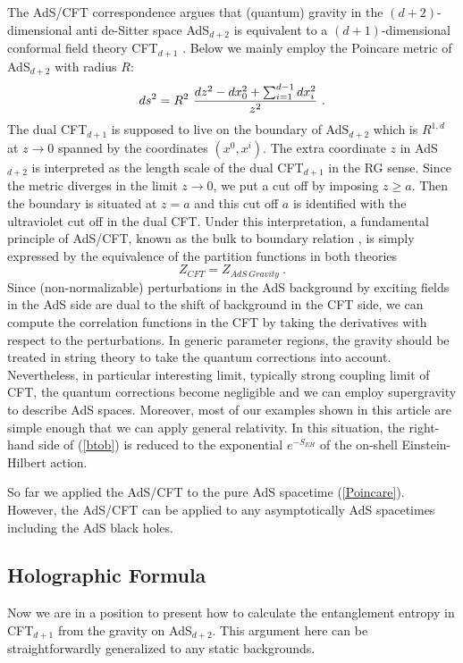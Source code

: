 \documentclass[12pt]{article}
\def\frac#1#2{{#1\over #2}}
\def\f {\frac}
\def\frac#1#2{{#1\over #2}}
\def\be{\begin{equation}}
\def\ee{\end{equation}}
\begin{document}
The AdS/CFT correspondence argues that (quantum) gravity in
the $(d+2)$-dimensional anti de-Sitter space AdS$_{d+2}$ is equivalent to a $(d+1)$-dimensional conformal
field theory CFT$_{d+1}$ \cite{Maldacena}. Below we mainly employ the
Poincare metric of AdS$_{d+2}$ with radius $R$:
\be ds^2=R^2~\f{dz^2-dx_0^2+
\sum_{i=1}^{d-1}dx_i^2}{z^2} \ .
\label{Poincare} \ee
The dual CFT$_{d+1}$ is supposed to live on the boundary of AdS$_{d+2}$
which is $R^{1,d}$
at $z\to 0$ spanned by the coordinates $(x^0,x^i)$. The extra coordinate
$z$ in AdS$_{d+2}$ is interpreted as the length scale of the dual CFT$_{d+1}$
in the RG sense.
Since the metric diverges
in the limit $z\to 0$, we put a cut off by imposing $z \geq a$. Then the boundary is situated
at $z=a$ and this cut off $a$ is identified with the ultraviolet cut off in the dual CFT.
Under this interpretation, a fundamental principle of AdS/CFT, known as the bulk to boundary
relation \cite{ADSGKP,ADSWitten}, is simply expressed by the equivalence of the partition
functions in both theories
\be
Z_{CFT}=Z_{AdS\ Gravity} \ .\label{btob}
\ee
Since (non-normalizable) perturbations in the AdS background by exciting fields in the AdS side
are dual to
the shift of background in the CFT side, we can compute the correlation functions in the CFT
by taking the derivatives with respect to the perturbations. In generic parameter regions,
the gravity should be treated in string theory to take the quantum corrections into account.
Nevertheless, in particular interesting limit, typically strong coupling limit of CFT,
the quantum corrections become negligible and we can employ supergravity to describe AdS
spaces. Moreover, most of our examples shown in this article are simple enough that we can apply
general relativity. In this situation, the right-hand side of (\ref{btob}) is reduced to the
exponential $e^{-S_{EH}}$ of the on-shell Einstein-Hilbert action.

So far we applied the AdS/CFT to the pure AdS spacetime (\ref{Poincare}).
However, the AdS/CFT can be applied to any asymptotically AdS spacetimes
including the AdS black holes.


\subsection{Holographic Formula}
\label{general proposal} \hspace{5mm}
Now we are in a position to present how to calculate the entanglement
entropy in CFT$_{d+1}$ from the gravity on AdS$_{d+2}$. This argument here
can be straightforwardly generalized to any static backgrounds.
\end{document}
